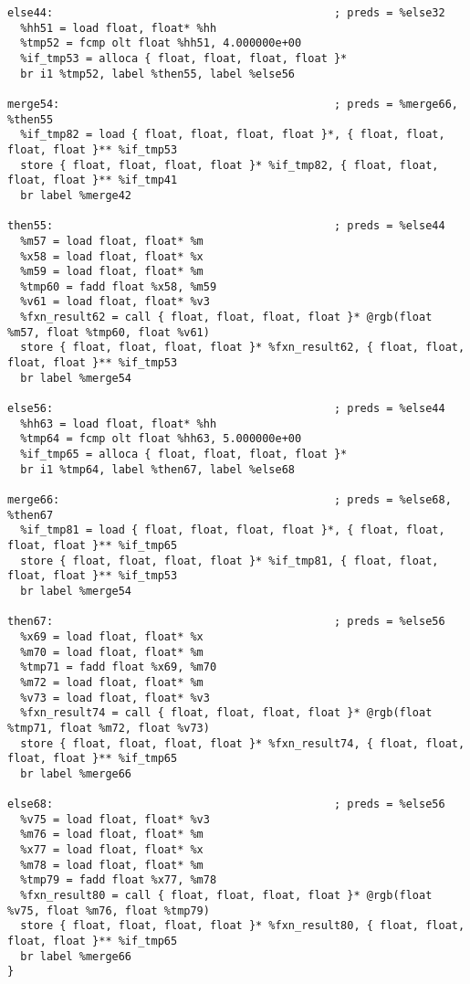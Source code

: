 \documentclass[main.tex]{subfiles}
\begin{document}
{\begin{lstlisting}
else44:                                           ; preds = %else32
  %hh51 = load float, float* %hh
  %tmp52 = fcmp olt float %hh51, 4.000000e+00
  %if_tmp53 = alloca { float, float, float, float }*
  br i1 %tmp52, label %then55, label %else56

merge54:                                          ; preds = %merge66, %then55
  %if_tmp82 = load { float, float, float, float }*, { float, float, float, float }** %if_tmp53
  store { float, float, float, float }* %if_tmp82, { float, float, float, float }** %if_tmp41
  br label %merge42

then55:                                           ; preds = %else44
  %m57 = load float, float* %m
  %x58 = load float, float* %x
  %m59 = load float, float* %m
  %tmp60 = fadd float %x58, %m59
  %v61 = load float, float* %v3
  %fxn_result62 = call { float, float, float, float }* @rgb(float %m57, float %tmp60, float %v61)
  store { float, float, float, float }* %fxn_result62, { float, float, float, float }** %if_tmp53
  br label %merge54

else56:                                           ; preds = %else44
  %hh63 = load float, float* %hh
  %tmp64 = fcmp olt float %hh63, 5.000000e+00
  %if_tmp65 = alloca { float, float, float, float }*
  br i1 %tmp64, label %then67, label %else68

merge66:                                          ; preds = %else68, %then67
  %if_tmp81 = load { float, float, float, float }*, { float, float, float, float }** %if_tmp65
  store { float, float, float, float }* %if_tmp81, { float, float, float, float }** %if_tmp53
  br label %merge54

then67:                                           ; preds = %else56
  %x69 = load float, float* %x
  %m70 = load float, float* %m
  %tmp71 = fadd float %x69, %m70
  %m72 = load float, float* %m
  %v73 = load float, float* %v3
  %fxn_result74 = call { float, float, float, float }* @rgb(float %tmp71, float %m72, float %v73)
  store { float, float, float, float }* %fxn_result74, { float, float, float, float }** %if_tmp65
  br label %merge66

else68:                                           ; preds = %else56
  %v75 = load float, float* %v3
  %m76 = load float, float* %m
  %x77 = load float, float* %x
  %m78 = load float, float* %m
  %tmp79 = fadd float %x77, %m78
  %fxn_result80 = call { float, float, float, float }* @rgb(float %v75, float %m76, float %tmp79)
  store { float, float, float, float }* %fxn_result80, { float, float, float, float }** %if_tmp65
  br label %merge66
}


\end{lstlisting}}
\end{document}
